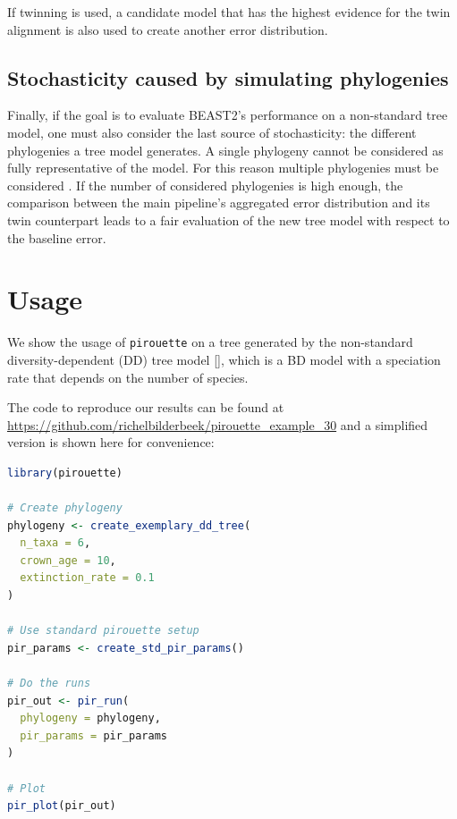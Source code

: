 If twinning is used, a candidate model that has the highest evidence for
the twin alignment is also used to create another error
distribution.

\subsection{Stochasticity caused by simulating phylogenies}

Finally, if the goal is to evaluate BEAST2's performance 
on a non-standard tree model, 
one must also consider the last source of stochasticity: 
the different phylogenies a tree model generates.
A single phylogeny cannot be considered as fully representative of the model. 
For this reason multiple phylogenies must be 
considered .
If the number of considered phylogenies is high enough, 
the comparison between the main pipeline's aggregated error distribution 
and its twin counterpart leads to a fair evaluation 
of the new tree model with respect to the baseline error.

\section{Usage}

We show the usage of \verb;pirouette; on a tree generated 
by the non-standard diversity-dependent (DD) tree 
model [\citep{DDD, etienne2012diversity}],
which is a BD model with a speciation rate that depends on the number of species. 

The code to reproduce our results can be found at  
\url{https://github.com/richelbilderbeek/pirouette_example_30}
and a simplified version is shown here for convenience:

\begin{lstlisting}[language=R]
library(pirouette)

# Create phylogeny
phylogeny <- create_exemplary_dd_tree(
  n_taxa = 6, 
  crown_age = 10,
  extinction_rate = 0.1
)

# Use standard pirouette setup
pir_params <- create_std_pir_params()

# Do the runs
pir_out <- pir_run(
  phylogeny = phylogeny,
  pir_params = pir_params
)

# Plot
pir_plot(pir_out)
\end{lstlisting}

